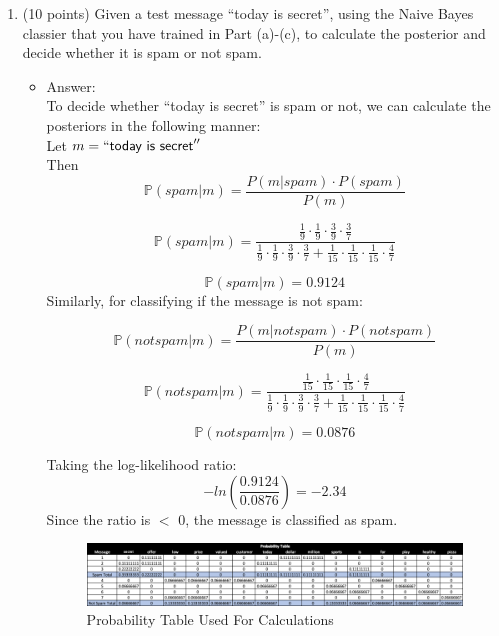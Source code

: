 \documentclass[twoside,10pt]{article}
\begin{document}
\begin{enumerate}
\begin{enumerate}
\item (10 points) Given a test message ``\textsf{today is secret}'', using the Naive Bayes classier that you have trained in Part (a)-(c), to calculate the posterior and decide whether it is spam or not spam.
\begin{itemize}
\item Answer:\\
To decide whether ``\textsf{today is secret}'' is spam or not, we can calculate the posteriors in the following manner:\\
Let $m = ``\textsf{today is secret}''$\\
Then
$$
\mathbb P (spam|m) = \frac{P (m|spam) \cdot P (spam)}{P (m)}
$$

$$
\mathbb P (spam|m) = \frac{\frac{1}{9} \cdot \frac{1}{9} \cdot \frac{3}{9} \cdot \frac{3}{7}}{\frac{1}{9} \cdot \frac{1}{9} \cdot \frac{3}{9} \cdot \frac{3}{7} + \frac{1}{15} \cdot \frac{1}{15} \cdot \frac{1}{15} \cdot \frac{4}{7}}
$$

$$
\mathbb P (spam|m) = 0.9124
$$
Similarly, for classifying if the message is not spam:

$$
\mathbb P (not spam|m) = \frac{P (m|not spam) \cdot P (not spam)}{P (m)}
$$

$$
\mathbb P (not spam|m) = \frac{\frac{1}{15} \cdot \frac{1}{15} \cdot \frac{1}{15} \cdot \frac{4}{7}}{\frac{1}{9} \cdot \frac{1}{9} \cdot \frac{3}{9} \cdot \frac{3}{7} + \frac{1}{15} \cdot \frac{1}{15} \cdot \frac{1}{15} \cdot \frac{4}{7}}
$$

$$
\mathbb P (not spam|m) = 0.0876
$$

Taking the log-likelihood ratio:
$$
-ln \left(\frac{0.9124}{0.0876}\right) = -2.34
$$
Since the ratio is $<$ 0, the message is classified as spam.


\begin{figure}[h!]
\begin{center}
\includegraphics[totalheight=1in]{Q3ProbabilityTable.png}
\end{center}
\caption{Probability Table Used For Calculations}
\end{figure}

\end{itemize}

\end{enumerate}


\end{enumerate}
\end{document}
